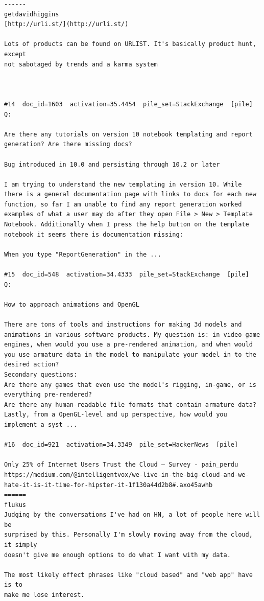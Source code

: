 \begin{verbatim}
------
getdavidhiggins
[http://urli.st/](http://urli.st/)

Lots of products can be found on URLIST. It's basically product hunt, except
not sabotaged by trends and a karma system



#14  doc_id=1603  activation=35.4454  pile_set=StackExchange  [pile]
Q:

Are there any tutorials on version 10 notebook templating and report generation? Are there missing docs?

Bug introduced in 10.0 and persisting through 10.2 or later

I am trying to understand the new templating in version 10. While there is a general documentation page with links to docs for each new function, so far I am unable to find any report generation worked examples of what a user may do after they open File > New > Template Notebook. Additionally when I press the help button on the template notebook it seems there is documentation missing:

When you type "ReportGeneration" in the ...

#15  doc_id=548  activation=34.4333  pile_set=StackExchange  [pile]
Q:

How to approach animations and OpenGL

There are tons of tools and instructions for making 3d models and animations in various software products. My question is: in video-game engines, when would you use a pre-rendered animation, and when would you use armature data in the model to manipulate your model in to the desired action?
Secondary questions:
Are there any games that even use the model's rigging, in-game, or is everything pre-rendered? 
Are there any human-readable file formats that contain armature data?
Lastly, from a OpenGL-level and up perspective, how would you implement a syst ...

#16  doc_id=921  activation=34.3349  pile_set=HackerNews  [pile]

Only 25% of Internet Users Trust the Cloud – Survey - pain_perdu
https://medium.com/@intelligentvox/we-live-in-the-big-cloud-and-we-hate-it-is-it-time-for-hipster-it-1f130a44d2b8#.axo45awhb
======
flukus
Judging by the conversations I've had on HN, a lot of people here will be
surprised by this. Personally I'm slowly moving away from the cloud, it simply
doesn't give me enough options to do what I want with my data.

The most likely effect phrases like "cloud based" and "web app" have is to
make me lose interest.




\end{verbatim}
